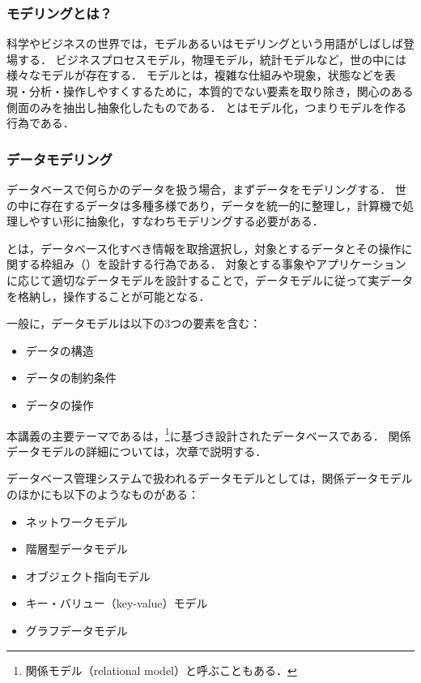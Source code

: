 \subsubsection{モデリングとは？}
科学やビジネスの世界では，モデルあるいはモデリングという用語がしばしば登場する．
ビジネスプロセスモデル，物理モデル，統計モデルなど，世の中には様々なモデルが存在する．
モデルとは，複雑な仕組みや現象，状態などを表現・分析・操作しやすくするために，本質的でない要素を取り除き，関心のある側面のみを抽出し抽象化したものである．
とはモデル化，つまりモデルを作る行為である．


\subsubsection{データモデリング}
データベースで何らかのデータを扱う場合，まずデータをモデリングする．
世の中に存在するデータは多種多様であり，データを統一的に整理し，計算機で処理しやすい形に抽象化，すなわちモデリングする必要がある．

とは，データベース化すべき情報を取捨選択し，対象とするデータとその操作に関する枠組み（）を設計する行為である．
対象とする事象やアプリケーションに応じて適切なデータモデルを設計することで，データモデルに従って実データを格納し，操作することが可能となる．

一般に，データモデルは以下の3つの要素を含む：
\begin{itemize}
\item データの構造
\item データの制約条件
\item データの操作
\end{itemize}

本講義の主要テーマであるは，\footnote{関係モデル（relational model）と呼ぶこともある．}に基づき設計されたデータベースである．
関係データモデルの詳細については，次章で説明する．

データベース管理システムで扱われるデータモデルとしては，関係データモデルのほかにも以下のようなものがある：
\begin{itemize}
\item ネットワークモデル\cite{Bachman1969}
\item 階層型データモデル\cite{Tsichritzis1976}
\item オブジェクト指向モデル\cite{Atkinson1994}
\item キー・バリュー（key-value）モデル\cite{DeCandia2007}
\item グラフデータモデル\cite{neo4j}
\end{itemize}

